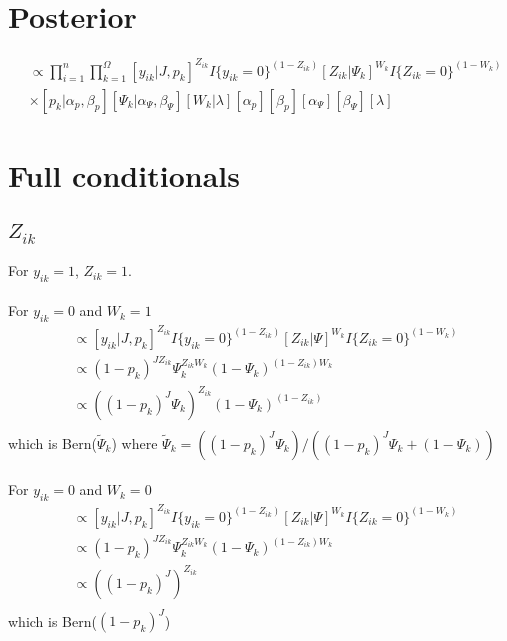 \documentclass[fleqn]{article}
\def\bm#1{\mbox{\boldmath $#1$}}
\begin{document}
\section{Posterior}
%
\begin{align*}
  [\bm{Z}, \bm{p}, \bm{\Psi}, \bm{W}, \alpha_p, \beta_p, \alpha_\Psi, \beta_\Psi, \lambda | \bm{y}, J] & \propto \prod_{i = 1}^n \prod_{k = 1}^\Omega [y_{ik} | J, p_k]^{Z_{ik}} I\{y_{ik} = 0 \}^{(1 -  Z_{ik})} [Z_{ik} | \Psi_k]^{W_k} I\{Z_{ik} = 0 \}^{(1 -  W_k)}\\
  & \times [p_k | \alpha_p, \beta_p] [\Psi_k | \alpha_\Psi, \beta_\Psi] [W_k | \lambda] [\alpha_p] [\beta_p] [\alpha_\Psi] [\beta_\Psi] [\lambda]
\end{align*}
%
\section{Full conditionals}
%
\subsection{$Z_{ik}$}
%
For $y_{ik} = 1$, $Z_{ik} = 1$.\\
\\
For $y_{ik} = 0$ and $W_k = 1$
\begin{align*}
  [Z_{ik} | \cdot] & \propto [y_{ik} | J, p_k]^{Z_{ik}} I \{y_{ik} = 0 \}^{(1 - Z_{ik})} [Z_{ik} | \Psi]^{W_k} I \{Z_{ik} = 0 \}^{(1 - W_{k})}\\
  & \propto (1 - p_k)^{J Z_{ik}} \Psi_k^{Z_{ik} W_k} (1 - \Psi_k)^{(1 - Z_{ik}) W_k}\\
  & \propto \left( (1 - p_k)^J \Psi_k \right)^{Z_{ik}} \left(1 - \Psi_k \right)^{(1 - Z_{ik})}\\
\end{align*}
which is Bern($\tilde{\Psi}_k$) where $\tilde{\Psi}_k = \left( (1 - p_k)^J \Psi_k \right) / \left( (1 - p_k)^J \Psi_k + (1 - \Psi_k)\right)$\\
\\%
For $y_{ik} = 0$ and $W_k = 0$
\begin{align*}
  [Z_{ik} | \cdot] & \propto [y_{ik} | J, p_k]^{Z_{ik}} I \{y_{ik} = 0 \}^{(1 - Z_{ik})} [Z_{ik} | \Psi]^{W_k} I \{Z_{ik} = 0 \}^{(1 - W_{k})}\\
  & \propto (1 - p_k)^{J Z_{ik}} \Psi_k^{Z_{ik} W_k} (1 - \Psi_k)^{(1 - Z_{ik}) W_k}\\
  & \propto ((1 - p_k)^J)^{Z_{ik}}\\
\end{align*}
which is Bern($(1 - p_k)^J$)\\
\\
%
\end{document}
